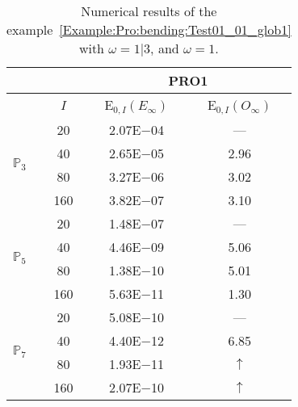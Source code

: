 \begin{table}[H]
\caption{Numerical results of the example~\ref{Example:Pro:bending:Test01_01_glob1} with $\omega=1|3$, and $\omega=1$.}
\setlength{\tabcolsep}{5pt}
\centering
\begin{tabular}{@{}l c c c@{}}
\toprule
 &  & \multicolumn{2}{c}{PRO1}\\
\midrule
 & $I$ & E$_{0,I}(E_{\infty})$ & E$_{0,I}(O_{\infty})$\\
\midrule
\multirow{4}{*}{$\mathbb{P}_{3}$} & 20 & 2.07E$-$04 & ---\\
 & 40 & 2.65E$-$05 & 2.96\\
 & 80 & 3.27E$-$06 & 3.02\\
 & 160 & 3.82E$-$07 & 3.10\\
\midrule
\multirow{4}{*}{$\mathbb{P}_{5}$} & 20 & 1.48E$-$07 & ---\\
 & 40 & 4.46E$-$09 & 5.06\\
 & 80 & 1.38E$-$10 & 5.01\\
 & 160 & 5.63E$-$11 & 1.30\\
\midrule
\multirow{4}{*}{$\mathbb{P}_{7}$} & 20 & 5.08E$-$10 & ---\\
 & 40 & 4.40E$-$12 & 6.85\\
 & 80 & 1.93E$-$11 & $\uparrow$\\
 & 160 & 2.07E$-$10 & $\uparrow$\\
\bottomrule
\end{tabular}
\label{Table:PRO:test_01_01_test14}
\end{table}
